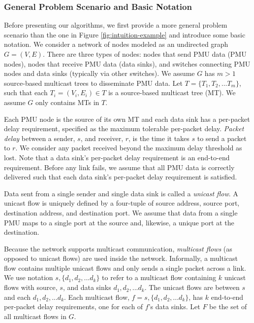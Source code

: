\subsubsection{General Problem Scenario and Basic Notation}
\label{subsubsec:mcast-scenario-notation}

Before presenting our algorithms, we first provide a more general problem scenario than the one in Figure \ref{fig:intuition-example} and introduce some basic notation.
We consider a network of nodes modeled as an undirected graph $G=(V,E)$.  There are three types of nodes:
nodes that send PMU data (PMU nodes), nodes that receive PMU data (data sinks), and switches connecting PMU nodes and data sinks (typically via other switches).
We assume $G$ has $m>1$ source-based multicast trees to disseminate PMU data.  Let $T = \{T_1,T_2, \dots T_m\}$, such that each $T_i = (V_i,E_i) \in T$ is a source-based multicast tree (MT). 
We assume $G$ only contains MTs in $T$. 

Each PMU node is the source of its own MT and each data sink has a per-packet delay requirement, specified as the maximum tolerable per-packet delay. 
\emph{Packet delay} between a sender, $s$, and receiver, $r$, is the time it takes $s$ to send a packet to $r$.  
We consider any packet received beyond the maximum delay threshold as lost. Note that a data sink's per-packet delay requirement is an end-to-end requirement.
Before any link fails, we assume that all PMU data is correctly delivered such that each data sink's per-packet delay requirement is satisfied. 

Data sent from a single sender and single data sink is called a \emph{unicast flow}.
A unicast flow is uniquely defined by a four-tuple of source address, source port, destination address, and destination port.  
We assume that data from a single PMU maps to a single port at the source and, likewise, a unique port at the destination. 

Because the network supports multicast communication, \emph{multicast flows} (as opposed to unicast flows) are used inside the network.  
Informally, a multicast flow contains multiple unicast flows and only sends a single packet across a link. 
We use notation $s,\{d_1,d_2, ... d_k\}$ to refer to a multicast flow containing $k$ unicast flows with source, $s$, and data sinks $d_1, d_2, ... d_k$.  The unicast flows are between $s$ and each $d_1, d_2, ... d_k$.
Each multicast flow, $f = s,\{d_1,d_2, ... d_k\}$, has $k$ end-to-end per-packet delay requirements, one for each of $f$'s data sinks. %
Let $F$ be the set of all multicast flows in $G$. 


